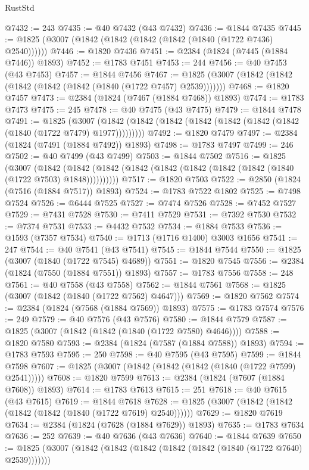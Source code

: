 \begin{lexlean}{RustStd}
\begin{coremodule}
{\begin{coremodule}
{{{{{{{{{{{{{{{{{{{{{{{{{{{{{{{{{{{{{{{{{{{{{{{@7432 := 243
@7435 := @40 @7432 (@43 @7432)
@7436 := @1844 @7435
@7445 := @1825 (@3007 (@1842 (@1842 (@1842 (@1842 (@1840 (@1722 @7436) @2540))))))
@7446 := @1820 @7436
@7451 := @2384 (@1824 (@7445 (@1884 @7446)) @1893)
@7452 := @1783 @7451
@7453 := 244
@7456 := @40 @7453 (@43 @7453)
@7457 := @1844 @7456
@7467 := @1825 (@3007 (@1842 (@1842 (@1842 (@1842 (@1842 (@1840 (@1722 @7457) @2539)))))))
@7468 := @1820 @7457
@7473 := @2384 (@1824 (@7467 (@1884 @7468)) @1893)
@7474 := @1783 @7473
@7475 := 245
@7478 := @40 @7475 (@43 @7475)
@7479 := @1844 @7478
@7491 := @1825
    (@3007 (@1842 (@1842 (@1842 (@1842 (@1842 (@1842 (@1842 (@1840 (@1722 @7479) @1977)))))))))
@7492 := @1820 @7479
@7497 := @2384 (@1824 (@7491 (@1884 @7492)) @1893)
@7498 := @1783 @7497
@7499 := 246
@7502 := @40 @7499 (@43 @7499)
@7503 := @1844 @7502
@7516 := @1825
    (@3007
      (@1842 (@1842 (@1842 (@1842 (@1842 (@1842 (@1842 (@1842 (@1840 (@1722 @7503) @1848))))))))))
@7517 := @1820 @7503
@7522 := @2850 (@1824 (@7516 (@1884 @7517)) @1893)
@7524 := @1783 @7522 @1802
@7525 := @7498 @7524
@7526 := @6444 @7525
@7527 := @7474 @7526
@7528 := @7452 @7527
@7529 := @7431 @7528
@7530 := @7411 @7529
@7531 := @7392 @7530
@7532 := @7374 @7531
@7533 := @4432 @7532
@7534 := @1884 @7533
@7536 := @1593 (@7357 @7534)
@7540 := @1713 (@1716 @1400) @3003 @1656
@7541 := 247
@7544 := @40 @7541 (@43 @7541)
@7545 := @1844 @7544
@7550 := @1825 (@3007 (@1840 (@1722 @7545) @4689))
@7551 := @1820 @7545
@7556 := @2384 (@1824 (@7550 (@1884 @7551)) @1893)
@7557 := @1783 @7556
@7558 := 248
@7561 := @40 @7558 (@43 @7558)
@7562 := @1844 @7561
@7568 := @1825 (@3007 (@1842 (@1840 (@1722 @7562) @4647)))
@7569 := @1820 @7562
@7574 := @2384 (@1824 (@7568 (@1884 @7569)) @1893)
@7575 := @1783 @7574
@7576 := 249
@7579 := @40 @7576 (@43 @7576)
@7580 := @1844 @7579
@7587 := @1825 (@3007 (@1842 (@1842 (@1840 (@1722 @7580) @4646))))
@7588 := @1820 @7580
@7593 := @2384 (@1824 (@7587 (@1884 @7588)) @1893)
@7594 := @1783 @7593
@7595 := 250
@7598 := @40 @7595 (@43 @7595)
@7599 := @1844 @7598
@7607 := @1825 (@3007 (@1842 (@1842 (@1842 (@1840 (@1722 @7599) @2541)))))
@7608 := @1820 @7599
@7613 := @2384 (@1824 (@7607 (@1884 @7608)) @1893)
@7614 := @1783 @7613
@7615 := 251
@7618 := @40 @7615 (@43 @7615)
@7619 := @1844 @7618
@7628 := @1825 (@3007 (@1842 (@1842 (@1842 (@1842 (@1840 (@1722 @7619) @2540))))))
@7629 := @1820 @7619
@7634 := @2384 (@1824 (@7628 (@1884 @7629)) @1893)
@7635 := @1783 @7634
@7636 := 252
@7639 := @40 @7636 (@43 @7636)
@7640 := @1844 @7639
@7650 := @1825 (@3007 (@1842 (@1842 (@1842 (@1842 (@1842 (@1840 (@1722 @7640) @2539)))))))
}}}}}}}}}}}}}}}}}}}}}}}}}}}}}}}}}}}}}}}}}}}}}}}
\end{coremodule}}
\end{coremodule}
\end{lexlean}
